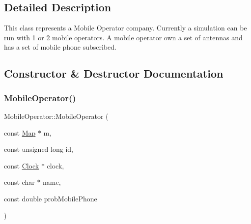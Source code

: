\subsection{Detailed Description}
This class represents a Mobile Operator company. Currently a simulation can be run with 1 or 2 mobile operators. A mobile operator own a set of antennas and has a set of mobile phone subscribed. 

\subsection{Constructor \& Destructor Documentation}
\mbox{\label{class_mobile_operator_a8a8ad5fccedc56a31118f248f2aa332f}} 
\subsubsection{\texorpdfstring{MobileOperator()}{MobileOperator()}}
{\footnotesize\ttfamily Mobile\+Operator\+::\+Mobile\+Operator (\begin{DoxyParamCaption}\item[{const \mbox{\hyperlink{class_map}{Map}} $\ast$}]{m,  }\item[{const unsigned long}]{id,  }\item[{const \mbox{\hyperlink{class_clock}{Clock}} $\ast$}]{clock,  }\item[{const char $\ast$}]{name,  }\item[{const double}]{prob\+Mobile\+Phone }\end{DoxyParamCaption})}

